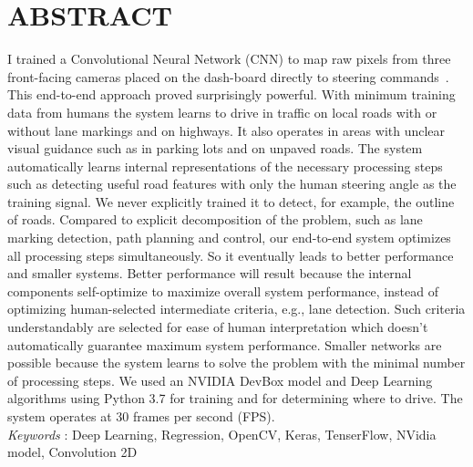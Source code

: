 \clearpage
{}
{}
\chapter*{ABSTRACT}
I trained a Convolutional Neural Network (CNN) to map raw pixels from three front-facing cameras placed on the dash-board directly to steering commands~\cite{neil2012s}. This end-to-end approach proved surprisingly powerful. With minimum training data from humans the system learns to drive in traffic on local roads with or without lane markings and on highways. It also operates in areas with unclear visual guidance such as in parking lots and on unpaved roads. The system automatically learns internal representations of the necessary processing steps such as detecting useful road features with only the human steering angle as the training signal. We never explicitly trained it to detect, for example, the outline of roads. Compared to explicit decomposition of the problem, such as lane marking detection, path planning and control, our end-to-end system optimizes all processing steps simultaneously. So it eventually leads to better performance and smaller systems. Better performance will result because the internal components self-optimize to maximize overall system performance, instead of optimizing human-selected intermediate criteria, e.g., lane detection. Such criteria understandably are selected for ease of human interpretation which doesn’t automatically guarantee maximum system performance. Smaller networks are possible because the system learns to solve the problem with the minimal number of processing steps. We used an NVIDIA DevBox model and Deep Learning algorithms using Python 3.7 for training and for determining where to drive. The system operates at 30 frames per second (FPS).\\

\textit{Keywords} : Deep Learning, Regression, OpenCV, Keras, TenserFlow, NVidia model, Convolution 2D